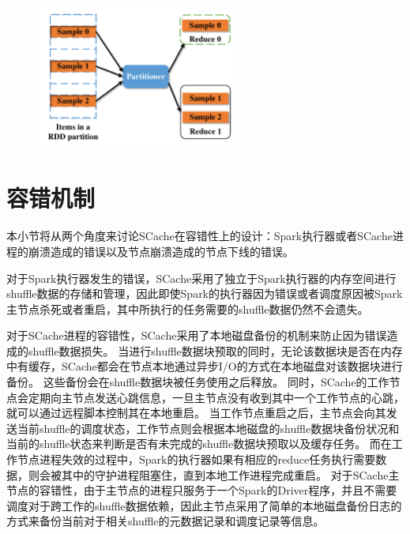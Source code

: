 \begin{figure}[!htp]
	\centering
	\includegraphics[width=0.6\textwidth]{../../PPoPP-2018/fig/sample.pdf}
\end{figure}

\section{容错机制}

本小节将从两个角度来讨论SCache在容错性上的设计：Spark执行器或者SCache进程的崩溃造成的错误以及节点崩溃造成的节点下线的错误。

对于Spark执行器发生的错误，SCache采用了独立于Spark执行器的内存空间进行shuffle数据的存储和管理，因此即使Spark的执行器因为错误或者调度原因被Spark主节点杀死或者重启，其中所执行的任务需要的shuffle数据仍然不会遗失。

对于SCache进程的容错性，SCache采用了本地磁盘备份的机制来防止因为错误造成的shuffle数据损失。
当进行shuffle数据块预取的同时，无论该数据块是否在内存中有缓存，SCache都会在节点本地通过异步I/O的方式在本地磁盘对该数据块进行备份。
这些备份会在shuffle数据块被任务使用之后释放。
同时，SCache的工作节点会定期向主节点发送心跳信息，一旦主节点没有收到其中一个工作节点的心跳，就可以通过远程脚本控制其在本地重启。
当工作节点重启之后，主节点会向其发送当前shuffle的调度状态，工作节点则会根据本地磁盘的shuffle数据块备份状况和当前的shuffle状态来判断是否有未完成的shuffle数据块预取以及缓存任务。
而在工作节点进程失效的过程中，Spark的执行器如果有相应的reduce任务执行需要数据，则会被其中的守护进程阻塞住，直到本地工作进程完成重启。
对于SCache主节点的容错性，由于主节点的进程只服务于一个Spark的Driver程序，并且不需要调度对于跨工作的shuffle数据依赖，因此主节点采用了简单的本地磁盘备份日志的方式来备份当前对于相关shuffle的元数据记录和调度记录等信息。

